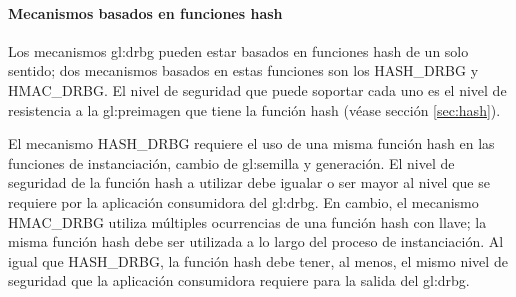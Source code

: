 %
%
\paragraph{Mecanismos basados en funciones hash}

Los mecanismos \gls{gl:drbg} pueden estar basados en funciones hash de un
solo sentido; dos mecanismos basados en estas funciones son los HASH\_DRBG
y HMAC\_DRBG. El nivel de seguridad que puede soportar cada uno es el nivel de
resistencia a la \gls{gl:preimagen} que tiene la función hash (véase sección
\ref{sec:hash}).

El mecanismo HASH\_DRBG requiere el uso de una misma función hash en las
funciones de instanciación, cambio de \gls{gl:semilla} y generación. El nivel
de seguridad de la función hash a utilizar debe igualar o ser mayor al
nivel que se requiere por la aplicación consumidora del \gls{gl:drbg}. En
cambio, el mecanismo HMAC\_DRBG utiliza múltiples ocurrencias de una función
hash con llave; la misma función hash debe ser utilizada a lo largo del proceso
de instanciación. Al igual que HASH\_DRBG, la función hash debe tener, al menos,
el mismo nivel de seguridad que la aplicación consumidora requiere para la
salida del \gls{gl:drbg}.
